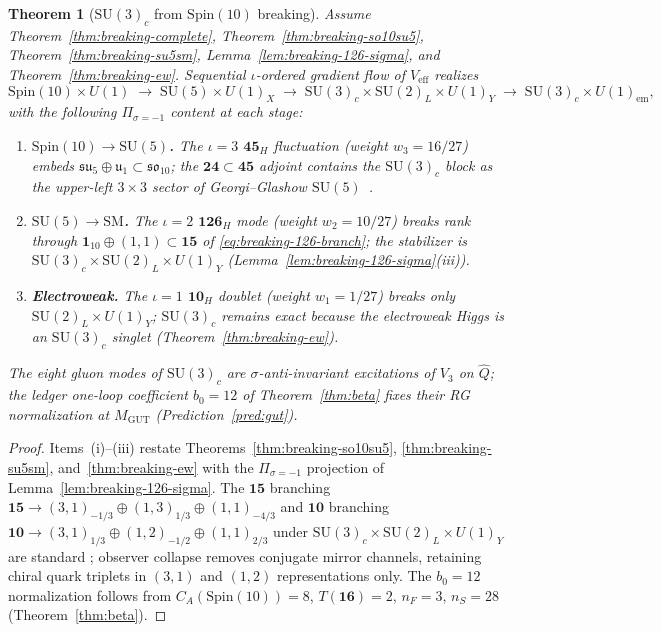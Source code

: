 \documentclass[aps,prd,onecolumn,amsmath,amssymb,nofootinbib,11pt]{revtex4-2}
\numberwithin{equation}{section}
\theoremstyle{plain}
\newtheorem{theorem}{Theorem}[section]
\theoremstyle{definition}
\theoremstyle{remark}
\newcommand{\Spin}{\mathrm{Spin}}
\begin{document}
\begin{theorem}[$\mathrm{SU}(3)_c$ from $\Spin(10)$ breaking]
\label{thm:qcd-derived}
Assume Theorem~\ref{thm:breaking-complete},
Theorem~\ref{thm:breaking-so10su5}, Theorem~\ref{thm:breaking-su5sm},
Lemma~\ref{lem:breaking-126-sigma}, and Theorem~\ref{thm:breaking-ew}.
Sequential $\iota$-ordered gradient flow of $V_{\mathrm{eff}}$ realizes
\begin{equation}\label{eq:qcd-breaking-chain}
  \Spin(10)\times U(1)
  \;\longrightarrow\;
  \mathrm{SU}(5)\times U(1)_X
  \;\longrightarrow\;
  \mathrm{SU}(3)_c\times\mathrm{SU}(2)_L\times U(1)_Y
  \;\longrightarrow\;
  \mathrm{SU}(3)_c\times U(1)_{\mathrm{em}},
\end{equation}
with the following $\Pi_{\sigma=-1}$ content at each stage:
\begin{enumerate}[label=(\roman*),leftmargin=*]
  \item \textbf{$\Spin(10)\to\mathrm{SU}(5)$.} The $\iota=3$
    $\mathbf{45}_H$ fluctuation (weight $w_3=16/27$) embeds
    $\mathfrak{su}_5\oplus\mathfrak{u}_1\subset\mathfrak{so}_{10}$; the
    $\mathbf{24}\subset\mathbf{45}$ adjoint contains the $\mathrm{SU}(3)_c$
    block as the upper-left $3\times3$ sector of Georgi--Glashow
    $\mathrm{SU}(5)$~\cite{GeorgiGlashow1974}.
  \item \textbf{$\mathrm{SU}(5)\to\mathrm{SM}$.} The $\iota=2$
    $\mathbf{126}_H$ mode (weight $w_2=10/27$) breaks rank through
    $\mathbf{1}_{10}\oplus(1,1)\subset\mathbf{15}$ of
    \eqref{eq:breaking-126-branch}; the stabilizer is
    $\mathrm{SU}(3)_c\times\mathrm{SU}(2)_L\times U(1)_Y$
    (Lemma~\ref{lem:breaking-126-sigma}(iii)).
  \item \textbf{Electroweak.} The $\iota=1$ $\mathbf{10}_H$ doublet
    (weight $w_1=1/27$) breaks only $\mathrm{SU}(2)_L\times U(1)_Y$;
    $\mathrm{SU}(3)_c$ remains exact because the electroweak Higgs is an
    $\mathrm{SU}(3)_c$ singlet (Theorem~\ref{thm:breaking-ew}).
\end{enumerate}
The eight gluon modes of $\mathrm{SU}(3)_c$ are $\sigma$-anti-invariant
excitations of $V_3$ on $\hat Q$; the ledger one-loop coefficient
$b_0=12$ of Theorem~\ref{thm:beta} fixes their RG normalization at
$M_{\mathrm{GUT}}$ (Prediction~\ref{pred:gut}).
\end{theorem}

\begin{proof}
Items~(i)--(iii) restate Theorems~\ref{thm:breaking-so10su5},
\ref{thm:breaking-su5sm}, and~\ref{thm:breaking-ew} with the
$\Pi_{\sigma=-1}$ projection of Lemma~\ref{lem:breaking-126-sigma}. The
$\mathbf{15}$ branching
$\mathbf{15}\to(3,1)_{-1/3}\oplus(1,3)_{1/3}\oplus(1,1)_{-4/3}$ and
$\mathbf{10}$ branching
$\mathbf{10}\to(3,1)_{1/3}\oplus(1,2)_{-1/2}\oplus(1,1)_{2/3}$ under
$\mathrm{SU}(3)_c\times\mathrm{SU}(2)_L\times U(1)_Y$ are standard
\cite{GeorgiGlashow1974,Witten1985}; observer collapse removes conjugate
mirror channels, retaining chiral quark triplets in $(3,1)$ and $(1,2)$
representations only. The $b_0=12$ normalization follows from
$C_A(\Spin(10))=8$, $T(\mathbf{16})=2$, $n_F=3$, $n_S=28$
(Theorem~\ref{thm:beta}).
\end{proof}
\end{document}
